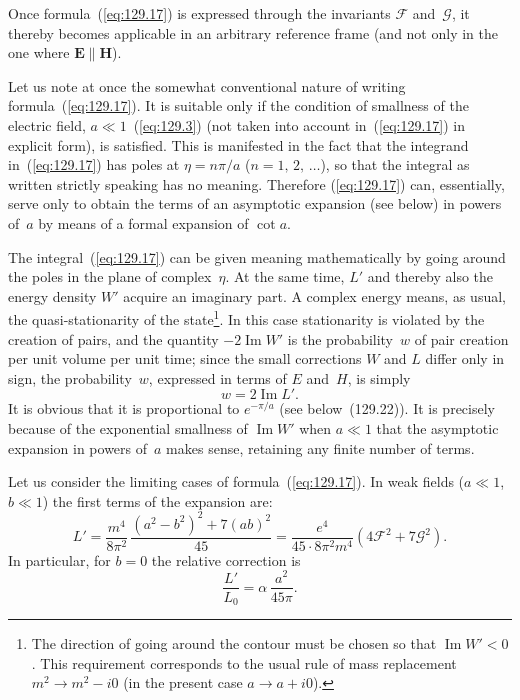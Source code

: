 Once formula~(\ref{eq:129.17}) is expressed through the invariants $\mathcal{F}$ and~$\mathcal{G}$, it thereby becomes applicable in an arbitrary reference frame (and not only in the one where $\mathbf{E}\parallel\mathbf{H}$).

Let us note at once the somewhat conventional nature of writing formula~(\ref{eq:129.17}). It is suitable only if the condition of smallness of the electric field, $a \ll 1$~(\ref{eq:129.3}) (not taken into account in~(\ref{eq:129.17}) in explicit form), is satisfied. This is manifested in the fact that the integrand in~(\ref{eq:129.17}) has poles at $\eta = n\pi/a$ ($n = 1,\,2,\,\ldots$), so that the integral as written strictly speaking has no meaning. Therefore (\ref{eq:129.17}) can, essentially, serve only to obtain the terms of an asymptotic expansion (see below) in powers of~$a$ by means of a formal expansion of $\cot a$.

The integral~(\ref{eq:129.17}) can be given meaning mathematically by going around the poles in the plane of complex~$\eta$. At the same time, $L'$ and thereby also the energy density $W'$ acquire an imaginary part. A complex energy means, as usual, the quasi-stationarity of the state\footnote{The direction of going around the contour must be chosen so that $\operatorname{Im} W' < 0$. This requirement corresponds to the usual rule of mass replacement $m^2 \to m^2 - i0$ (in the present case $a \to a + i0$).}. In this case stationarity is violated by the creation of pairs, and the quantity $-2\operatorname{Im}W'$ is the probability~$w$ of pair creation per unit volume per unit time; since the small corrections $W$ and $L$ differ only in sign, the probability~$w$, expressed in terms of $E$ and~$H$, is simply
\begin{equation}
w = 2\operatorname{Im}L'.
\label{eq:129.20}
\end{equation}
It is obvious that it is proportional to $e^{-\pi/a}$ (see below~(129.22)). It is precisely because of the exponential smallness of $\operatorname{Im} W'$ when $a\ll 1$ that the asymptotic expansion in powers of~$a$ makes sense, retaining any finite number of terms.

Let us consider the limiting cases of formula~(\ref{eq:129.17}). In weak fields ($a\ll 1$, $b\ll 1$) the first terms of the expansion are:
\begin{equation}
L' = \frac{m^4}{8\pi^2}\,\frac{(a^2-b^2)^2+7(ab)^2}{45} = \frac{e^4}{45\cdot 8\pi^2 m^4}(4\mathcal{F}^2+7\mathcal{G}^2).
\label{eq:129.21}
\end{equation}
In particular, for $b = 0$ the relative correction is
\[
\frac{L'}{L_0} = \alpha\,\frac{a^2}{45\pi}.
\]

